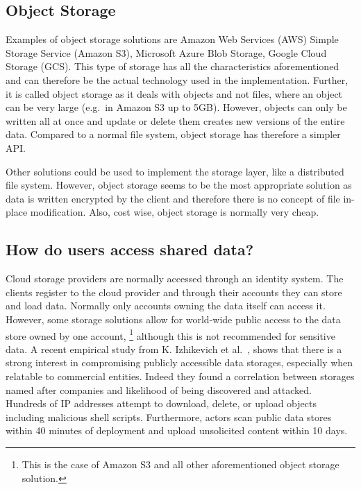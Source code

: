 \subsection{Object Storage}\label{ssc:object-storage}
Examples of object storage solutions are Amazon Web Services (AWS)
Simple Storage Service (Amazon S3), Microsoft Azure Blob Storage, Google Cloud Storage (GCS).
This type of storage has all the characteristics aforementioned and can 
therefore be the actual technology used in the implementation. 
Further, it is called object storage as it deals with objects and not files, 
where an object can be very large (e.g.\ in Amazon S3 up to 5GB).
However, objects can only be written all at once
and update or delete them creates new versions of the entire data.
Compared to a normal file system, object storage has therefore a simpler API.

Other solutions could be used to implement the storage layer,
like a distributed file system.
However, object storage seems to be the most appropriate
solution as data is written encrypted by the client and therefore
there is no concept of file in-place modification.
Also, cost wise, object storage is normally very cheap.

\subsection{How do users access shared data?}
Cloud storage providers are normally accessed through an
identity system. The clients register to the cloud provider and
through their accounts they can store and load data.
Normally only accounts owning the data itself can access it.
However, some storage solutions allow for world-wide public access 
to the data store owned by one account,
\footnote{This is the case of Amazon S3 and all other aforementioned object storage solution.} 
although this is not recommended for sensitive data.
A recent empirical study from K. Izhikevich et al.~\cite{izhikevich2023using},
shows that there is a strong interest
in compromising publicly accessible data storages,
especially when relatable to commercial entities.
Indeed they found a correlation between storages named after companies and likelihood of being discovered and attacked.
Hundreds of IP addresses attempt to download, delete, or upload objects including malicious shell scripts. 
Furthermore, actors scan public data stores within 40 minutes of deployment and upload unsolicited content within 10 days.

